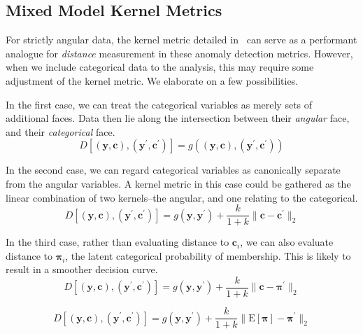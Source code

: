 \subsection{Mixed Model Kernel Metrics}
For strictly angular data, the kernel metric detailed in~\cite{trubey:pg} can 
  serve as a performant analogue for \emph{distance} measurement in these 
  anomaly detection metrics.  However, when we include categorical data to the 
  analysis, this may require some adjustment of the kernel metric.  We elaborate 
  on a few possibilities.

In the first case, we can treat the categorical variables as merely sets of 
  additional faces.  Data then lie along the intersection between their 
  \emph{angular} face, and their \emph{categorical} face.
  \begin{equation}
    D\left[(\bm{y},\bm{c}), (\bm{y}^{\prime}, \bm{c}^{\prime})\right] = 
        g\left((\bm{y},\bm{c}), (\bm{y}^{\prime}, \bm{c}^{\prime})\right)
  \end{equation}

In the second case, we can regard categorical variables as canonically separate 
  from the angular variables. A kernel metric in this case could be gathered as 
  the linear combination of two kernels--the angular, and one relating to the 
  categorical.  
  \begin{equation*}
    D\left[(\bm{y},\bm{c}), (\bm{y}^{\prime}, \bm{c}^{\prime})\right] = 
      g(\bm{y},\bm{y}^{\prime}) + 
          \frac{k}{1 + k}\lVert \bm{c} - \bm{c}^{\prime}\rVert_2
  \end{equation*}
    
In the third case, rather than evaluating distance to $\bm{c}_i$, we can also 
  evaluate distance to $\bm{\pi}_i$, the latent categorical probability of 
  membership.  This is likely to result in a smoother decision curve.
  \begin{equation*}
    D\left[(\bm{y},\bm{c}), (\bm{y}^{\prime}, \bm{c}^{\prime})\right] = 
      g(\bm{y},\bm{y}^{\prime}) + 
          \frac{k}{1 + k}\lVert \bm{c} - \bm{\pi}^{\prime}\rVert_2
  \end{equation*}

  \[
    D\left[(\bm{y},\bm{c}), (\bm{y}^{\prime}, \bm{c}^{\prime})\right] = 
      g(\bm{y},\bm{y}^{\prime}) + 
          \frac{k}{1 + k}\lVert \text{E}[\bm{\pi}] - \bm{\pi}^{\prime}\rVert_2
  \]

